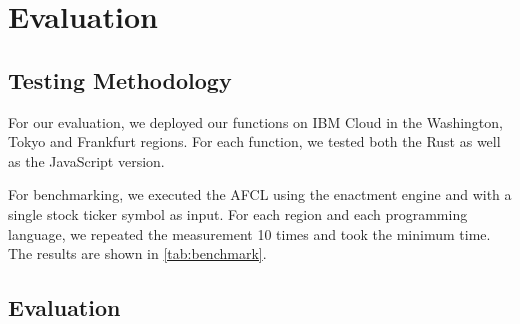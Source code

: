 \chapter{\label{chap:evaluation}Evaluation}

\section{Testing Methodology}

For our evaluation, we deployed our functions on IBM Cloud in the Washington,
Tokyo and Frankfurt regions. For each function, we tested both the Rust as
well as the JavaScript version.

For benchmarking, we executed the AFCL using the enactment engine and with a
single stock ticker symbol as input. For each region and each programming
language, we repeated the measurement 10 times and took the minimum time.
The results are shown in \cref{tab:benchmark}.

\section{Evaluation}

